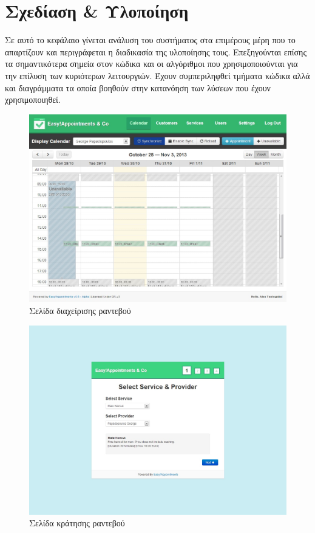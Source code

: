 
\chapter{Σχεδίαση \& Υλοποίηση}
Σε αυτό το κεφάλαιο γίνεται ανάλυση του συστήματος στα επιμέρους μέρη που το απαρτίζουν και περιγράφεται η διαδικασία της υλοποίησης τους. Επεξηγούνται επίσης τα σημαντικότερα σημεία στον κώδικα και οι αλγόριθμοι που χρησιμοποιούνται για την επίλυση των κυριότερων λειτουργιών. Έχουν συμπεριληφθεί τμήματα κώδικα αλλά και διαγράμματα τα οποία βοηθούν στην κατανόηση των λύσεων που έχουν χρησιμοποιηθεί.

\begin{figure}[ht!]
\centering
\includegraphics[width=130mm]{images/backend-calendar.jpg}
\caption{Σελίδα διαχείρισης ραντεβού}
\label{backend-calendar}
\end{figure}

\begin{figure}[ht!]
\centering
\includegraphics[width=130mm]{images/book-appointment.jpg}
\caption{Σελίδα κράτησης ραντεβού}
\label{book-appointment}
\end{figure}

